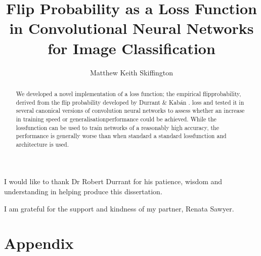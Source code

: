 \documentclass[12pt]{uwthesis17}
\title{Flip Probability as a Loss Function in Convolutional Neural Networks for Image Classification}
\author{Matthew Keith Skiffington}
\begin{document}
\maketitle
\setcounter{page}{2}

\setlength{\parindent}{0pt} %

\begin{abstract}

We developed a novel implementation of a \gls{loss} function; the empirical \gls{flipprobability}, derived from the flip probability developed by Durrant \& Kab\'an \cite{durrant2013sharp}. \gls{loss} and tested it in several canonical versions of convolution neural networks to assess whether an increase in training speed or \gls{generalisationperformance} could be achieved. While the \gls{lossfunction} can be used to train networks of a reasonably high accuracy, the performance is generally worse than when standard a standard \gls{lossfunction} and architecture is used. 

\end{abstract}
\begin{acknowledgements}

\bigskip

\begin{spacing}{2}

I would like to thank Dr Robert Durrant for his patience, wisdom and understanding in helping produce this dissertation.
\bigskip

I am grateful for the support and kindness of my partner, Renata Sawyer.
\bigskip

\end{spacing}

\end{acknowledgements}
\tableofcontents
\listoffigures
\listoftables



\newpage
{}
\setcounter{page}{1}








\chapter{Appendix}

\printglossary[type=\acronymtype]
\printglossary[type=main]

\pagebreak



\end{document}
